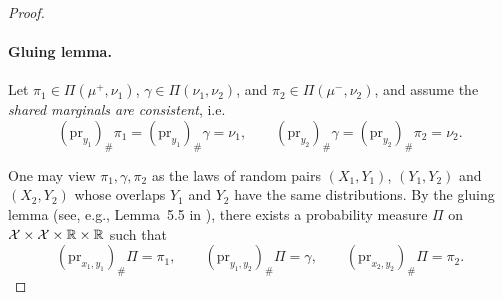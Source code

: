 \documentclass[11pt]{article}
\begin{document}
\begin{proof}

\paragraph{Gluing lemma.}
Let $\pi_1\in\Pi(\mu^+,\nu_1)$, $\gamma\in\Pi(\nu_1,\nu_2)$, and $\pi_2\in\Pi(\mu^-,\nu_2)$, and assume the
\emph{shared marginals are consistent}, i.e.
\begin{equation*}
  (\mathrm{pr}_{y_1})_\#\pi_1=(\mathrm{pr}_{y_1})_\#\gamma=\nu_1,
\qquad
(\mathrm{pr}_{y_2})_\#\gamma=(\mathrm{pr}_{y_2})_\#\pi_2=\nu_2.
\end{equation*}

One may view $\pi_1,\gamma,\pi_2$ as the laws of random pairs
$(X_1,Y_1)$, $(Y_1,Y_2)$ and $(X_2,Y_2)$ whose overlaps $Y_1$ and $Y_2$ have the same distributions.
By the gluing lemma (see, e.g., Lemma~5.5 in \textcite{Santambrogio2015}), there exists a probability measure
$\Pi$ on $\mathcal X\times\mathcal X\times\mathbb{R}\times\mathbb{R}$ such that
\begin{equation*}
  (\mathrm{pr}_{x_1,y_1})_\#\Pi=\pi_1,\qquad
(\mathrm{pr}_{y_1,y_2})_\#\Pi=\gamma,\qquad
(\mathrm{pr}_{x_2,y_2})_\#\Pi=\pi_2.
\end{equation*}


\end{proof}
\end{document}
